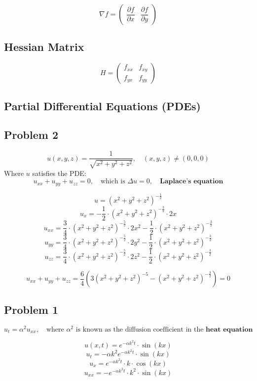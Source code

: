 \documentclass[11pt]{article}
\begin{document}
\[
\nabla f = \begin{pmatrix}
    \dfrac{\partial f}{\partial x} &
    \dfrac{\partial f}{\partial y}
\end{pmatrix}
\]

\subsection*{Hessian Matrix}
\[
H = \begin{pmatrix}
    f_{xx} & f_{xy} \\
    f_{yx} & f_{yy}
\end{pmatrix}
\]

\subsection{Partial Differential Equations (PDEs)}
\subsection*{Problem 2}
\[
u(x,y,z) = \frac{1}{\sqrt{x^2 + y^2 + z^2}}, \quad (x,y,z) \neq (0,0,0)
\]
Where $u$ satisfies the PDE:
\[
u_{xx} + u_{yy} + u_{zz} = 0, \quad \text{which is } \Delta u = 0, \quad \textbf{Laplace's equation}
\]

\[
u = (x^2 + y^2 + z^2)^{-\frac{1}{2}}
\]
\[
u_x = -\frac{1}{2} \cdot (x^2 + y^2 + z^2)^{-\frac{3}{2}} \cdot 2x 
\]
\[
u_{xx} = \frac{3}{4} \cdot (x^2 + y^2 + z^2)^{-\frac{5}{2}} \cdot 2x^2 - \frac{1}{2} \cdot (x^2 + y^2 + z^2)^{-\frac{3}{2}}
\]
\[
u_{yy} = \frac{3}{4} \cdot (x^2 + y^2 + z^2)^{-\frac{5}{2}} \cdot 2y^2 - \frac{1}{2} \cdot (x^2 + y^2 + z^2)^{-\frac{3}{2}}
\]
\[
u_{zz} = \frac{3}{4} \cdot (x^2 + y^2 + z^2)^{-\frac{5}{2}} \cdot 2z^2 - \frac{1}{2} \cdot (x^2 + y^2 + z^2)^{-\frac{3}{2}}
\]

\[
u_{xx} + u_{yy} + u_{zz} = \frac{6}{4} \left(3(x^2 + y^2 + z^2)^{-5} - (x^2 + y^2 + z^2)^{-\frac{3}{2}} \right) = 0
\]

\subsection*{Problem 1}
\[
u_t = \alpha^2 u_{xx}, \quad \text{where } \alpha^2 \text{ is known as the diffusion coefficient in the } \textbf{heat equation}
\]

\[
u(x,t) = e^{-\alpha k^2 t} \cdot \sin(kx)
\]
\[
u_t = -\alpha k^2 e^{-\alpha k^2 t} \cdot \sin(kx)  
\]
\[
u_{x} = e^{-\alpha k^2 t} \cdot k \cdot \cos(kx)
\]
\[
u_{xx} = -e^{-\alpha k^2 t} \cdot k^2 \cdot \sin(kx)
\]
\end{document}
